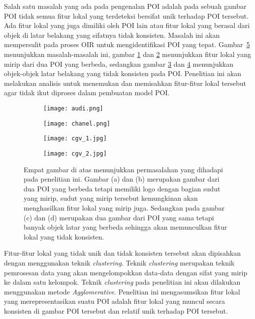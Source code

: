 Salah satu masalah yang ada pada pengenalan POI adalah pada sebuah gambar POI tidak semua fitur lokal yang terdeteksi bersifat unik terhadap POI tersebut. Ada fitur lokal yang juga dimiliki oleh POI lain atau fitur lokal yang berasal dari objek di latar belakang yang sifatnya tidak konsisten. Masalah ini akan mempersulit pada proses OIR untuk mengidentifikasi POI yang tepat. Gambar~\ref{fig:keypoint_non_unique} menunjukkan masalah-masalah ini, gambar \ref{subfig:audi} dan \ref{subfig:chanel} menunjukkan fitur lokal yang mirip dari dua POI yang berbeda, sedangkan gambar \ref{subfig:cgv} dan \ref{subfig:cgv2} menunjukkan objek-objek latar belakang yang tidak konsisten pada POI. Penelitian ini akan melakukan analisis untuk menemukan dan memisahkan fitur-fitur lokal tersebut agar tidak ikut diproses dalam pembuatan model POI.

\begin{figure}[H]
	\begin{subfigure}[b]{.5\textwidth}
		\centering
		\texttt{[image: audi.png]}
		\caption{}
		\label{subfig:audi}
	\end{subfigure}%
	\begin{subfigure}[b]{.5\textwidth}
		\centering
		\texttt{[image: chanel.png]}
		\caption{}
		\label{subfig:chanel}
	\end{subfigure}
	\begin{subfigure}[b]{.5\textwidth}
		\centering
		\texttt{[image: cgv\_1.jpg]}
		\caption{}
		\label{subfig:cgv}
	\end{subfigure}%
	\begin{subfigure}[b]{.5\textwidth}
		\centering
		\texttt{[image: cgv\_2.jpg]}
		\caption{}
		\label{subfig:cgv2}
	\end{subfigure}
	\caption{Empat gambar di atas menunjukkan permasalahan yang dihadapi pada penelitian ini. Gambar (a) dan (b) merupakan gambar dari dua POI yang berbeda tetapi memiliki logo dengan bagian sudut yang mirip, sudut yang mirip tersebut kemungkinan akan menghasilkan fitur lokal yang mirip juga. Sedangkan pada gambar (c) dan (d) merupakan dua gambar dari POI yang sama tetapi banyak objek latar yang berbeda sehingga akan memunculkan fitur lokal yang tidak konsisten.}
	\label{fig:keypoint_non_unique}
\end{figure}
Fitur-fitur lokal yang tidak unik dan tidak konsisten tersebut akan dipisahkan dengan menggunakan teknik \textit{clustering}. Teknik \textit{clustering} merupakan teknik pemrosesan data yang akan mengelompokkan data-data dengan sifat yang mirip ke dalam satu kelompok. Teknik \textit{clustering} pada penelitian ini akan dilakukan menggunakan metode \textit{Agglomerative}. Penelitian ini mengasumsikan fitur lokal yang merepresentasikan suatu POI adalah fitur lokal yang muncul secara konsisten di gambar POI tersebut dan relatif unik terhadap POI tersebut.

